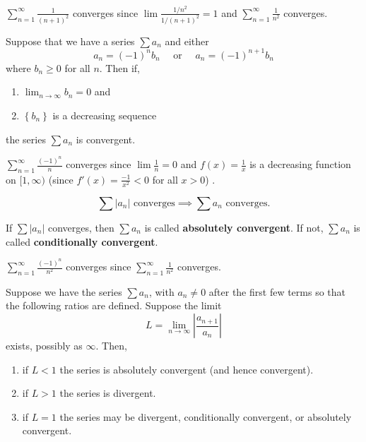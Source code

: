 \begin{exampleblock}
$\displaystyle \sum_{n=1}^\infty \frac{1}{(n+1)^2}$ converges since $\lim \frac{1/n^2}{1/(n+1)^2}=1$ and $\displaystyle\sum_{n=1}^\infty \frac{1}{n^2}$ converges.
\end{exampleblock}


\begin{thm}
Suppose that we have a series $\sum a_{n}$ and either $$a_{n}=(-1)^{n} b_{n}\quad\text{ or }\quad  a_{n}=(-1)^{n+1} b_{n}$$ where $b_{n} \geq 0$ for all $n .$ Then if,
\begin{enumerate}
    \item $\displaystyle\lim _{n \to \infty} b_{n}=0$ and
    \item $\left\{b_{n}\right\}$ is a decreasing sequence
\end{enumerate}
the series $\sum a_{n}$ is convergent.
\end{thm}


\begin{exampleblock}
$\displaystyle \sum_{n=1}^\infty \frac{(-1)^n}{n}$ converges since $\lim \frac1n=0$ and $f(x)=\frac{1}{x}$ is a decreasing function on $[1, \infty)$ (since $f'(x)=\frac{-1}{x^2}<0$ for all $x>0$) .
\end{exampleblock}



\begin{thm}
$$\sum |a_n| \text{ converges}\implies \sum a_n\text{ converges}.$$
\end{thm}

If $\sum |a_n|$ converges, then $\sum a_n$ is called \textbf{absolutely convergent}. If not, $\sum a_n$ is called \textbf{conditionally convergent}.


\begin{exampleblock}
$\displaystyle \sum_{n=1}^\infty \frac{(-1)^n}{n^2}$ converges since $\displaystyle \sum_{n=1}^\infty \frac{1}{n^2}$ converges.
\end{exampleblock}



\begin{thm}
Suppose we have the series $\sum a_n$, with $a_n\ne0$ after the first
few terms so that the following ratios are defined. Suppose the limit
$$L=\lim _{n \to \infty} \left|\frac{a_{n+1}}{a_{n}}\right|$$
exists, possibly as $\infty$. Then,
\begin{enumerate}[leftmargin=1em]
    \item if $L<1$ the series is absolutely convergent (and hence convergent).
    \item if $L>1$ the series is divergent.
    \item  if $L=1$ the series may be divergent, conditionally convergent, or absolutely convergent.
\end{enumerate}
\end{thm}


